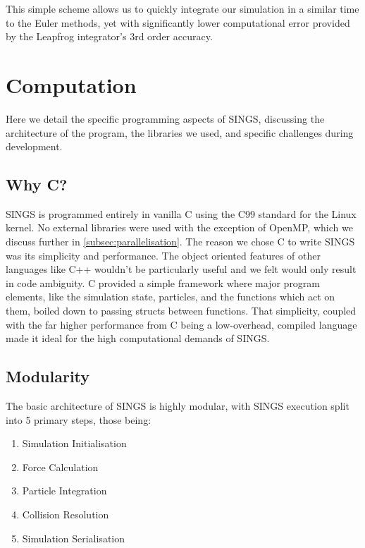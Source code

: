 \documentclass[12pt, twoside, letterpaper]{article}
\begin{document}
This simple scheme allows us to quickly integrate our simulation in a similar time to the Euler methods, yet with significantly lower computational error provided by the Leapfrog integrator's 3rd order accuracy.

\section{Computation} \label{sec:CS}
Here we detail the specific programming aspects of SINGS, discussing the architecture of the program, the libraries we used, and specific challenges during development.

\subsection{Why C?} \label{subsec:vanillac}
SINGS is programmed entirely in vanilla C using the C99 standard for the Linux kernel. No external libraries were used with the exception of OpenMP, which we discuss further in \ref{subsec:parallelisation}. The reason we chose C to write SINGS was its simplicity and performance. The object oriented features of other languages like C++ wouldn't be particularly useful and we felt would only result in code ambiguity. C provided a simple framework where major program elements, like the simulation state, particles, and the functions which act on them, boiled down to passing structs between functions. That simplicity, coupled with the far higher performance from C being a low-overhead, compiled language made it ideal for the high computational demands of SINGS. 

\subsection{Modularity} \label{subsec:modularity}
The basic architecture of SINGS is highly modular, with SINGS execution split into 5 primary steps, those being:
\begin{enumerate}
	\item Simulation Initialisation
	\item Force Calculation
	\item Particle Integration
	\item Collision Resolution
	\item Simulation Serialisation
\end{enumerate}
\end{document}
